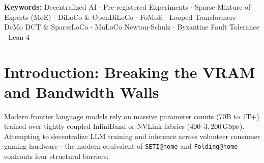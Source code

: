 \documentclass[11pt,a4paper]{article}
\begin{document}
\begin{abstract}
5xx errors.

\end{abstract}

\vspace{0.3em}
\noindent\textbf{Keywords:} Decentralized AI $\cdot$ Pre-registered Experiments $\cdot$ Sparse Mixture-of-Experts (MoE) $\cdot$ DiLoCo \& OpenDiLoCo $\cdot$ FoMoE $\cdot$ Looped Transformers $\cdot$ DeMo DCT \& SparseLoCo $\cdot$ MuLoCo Newton-Schulz $\cdot$ Byzantine Fault Tolerance $\cdot$ Lean 4

\tableofcontents
\newpage

\section{Introduction: Breaking the VRAM and Bandwidth Walls}

Modern frontier language models rely on massive parameter counts ($70\text{B} \text{ to } 1\text{T+}$) trained over tightly coupled InfiniBand or NVLink fabrics ($400\text{--}3,200\text{\,Gbps}$). Attempting to decentralize LLM training and inference across volunteer consumer gaming hardware---the modern equivalent of \texttt{SETI@home} \cite{anderson2002boinc} and \texttt{Folding@home}---confronts four structural barriers:
\end{document}
